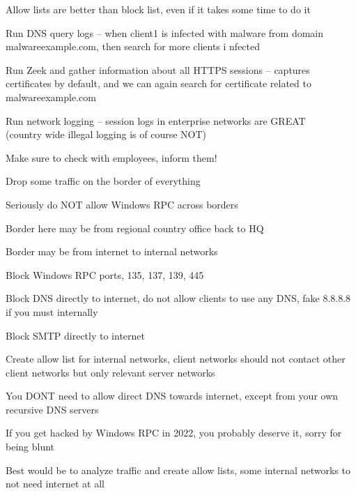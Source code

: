 \documentclass[Screen16to9,17pt]{foils}
\begin{document}
Allow lists are better than block list, even if it takes some time to do it



\begin{list2}
\item Run DNS query logs -- when client1 is infected with malware from domain malwareexample.com, then search for more clients i
nfected
\item Run Zeek and gather information about all HTTPS sessions -- captures certificates by default, and we can again search for
certificate related to malwareexample.com
\item Run network logging -- session logs in enterprise networks are GREAT \\
(country wide illegal logging is of course NOT)
\end{list2}

Make sure to check with employees, inform them!


\begin{list2}
\item Drop some traffic on the border of everything
\item Seriously do NOT allow Windows RPC across borders
\item Border here may be from regional country office back to HQ
\item Border may be from internet to internal networks
\item Block Windows RPC ports, 135, 137, 139, 445
\item Block DNS directly to internet, do not allow clients to use any DNS, fake 8.8.8.8 if you must internally
\item Block SMTP directly to internet
\item Create allow list for internal networks, client networks should not contact other client networks but only relevant server networks
\end{list2}

You DONT need to allow direct DNS towards internet, except from your own recursive DNS servers

If you get hacked by Windows RPC in 2022, you probably deserve it, sorry for being blunt

Best would be to analyze traffic and create allow lists, some internal networks to not need internet at all


\end{document}
